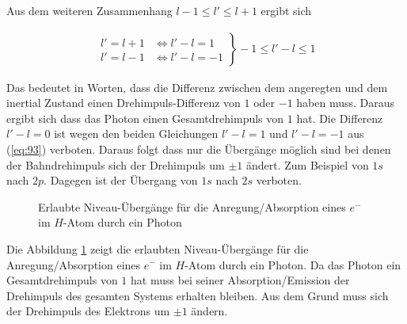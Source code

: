 Aus dem weiteren Zusammenhang \(l-1\le l'\le l+1\) ergibt sich

\begin{align}
  \label{eq:93}
 \left.
 \begin{array}{ll}
  l'=l+1 &\Leftrightarrow l'- l = 1 \\
  l'=l-1&\Leftrightarrow l'-l=-1 
  \end{array}
 \right\} 
 -1\le l' - l \le 1
\end{align}
 
Das bedeutet in Worten, dass die Differenz zwischen dem angeregten und dem inertial Zustand einen Drehimpuls-Differenz von \(1\) oder \(-1\) haben muss. Daraus ergibt sich dass das Photon einen Gesamtdrehimpuls von \(1\) hat. Die Differenz \(l'-l=0\) ist wegen den beiden Gleichungen \(l'-l=1\) und \(l'-l=-1\) aus (\ref{eq:93}) verboten. Daraus folgt dass nur die Übergänge möglich sind bei denen der Bahndrehimpuls sich der Drehimpuls um \(\pm 1\) ändert. Zum Beispiel von \(1s\) nach \(2p\). Dagegen ist der Übergang von \(1s\) nach \(2s\) verboten.



\begin{figure}[!thb]
  \centering
  
  \caption{Erlaubte Niveau-Übergänge für die Anregung/Absorption eines \(e^-\) im \(H\)-Atom durch ein Photon }
 \label{fig:4}
\end{figure}

Die Abbildung \ref{fig:4} zeigt die erlaubten Niveau-Übergänge für die Anregung/Absorption eines \(e^-\) im \(H\)-Atom durch ein Photon. Da das Photon ein Gesamtdrehimpuls von \(1\) hat muss bei seiner Absorption/Emission der Drehimpuls des gesamten Systems erhalten bleiben. Aus dem Grund muss sich der Drehimpuls des Elektrons um \(\pm 1\) ändern.






